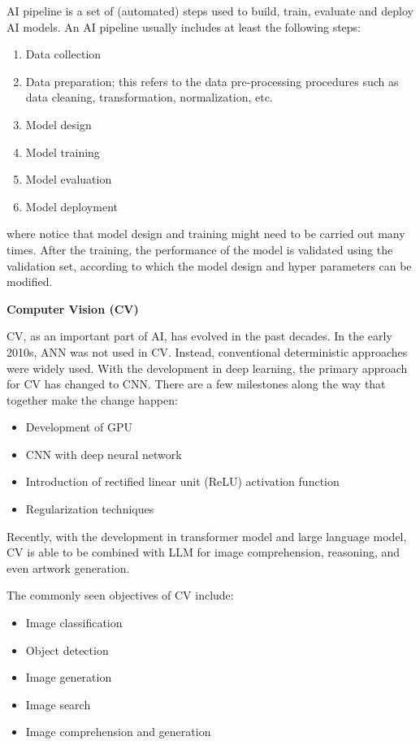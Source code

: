 AI pipeline is a set of (automated) steps used to build, train, evaluate and deploy AI models. An AI pipeline usually includes at least the following steps:
\begin{enumerate}
  \item Data collection
  \item Data preparation; this refers to the data pre-processing procedures such as data cleaning, transformation, normalization, etc.
  \item Model design
  \item Model training
  \item Model evaluation
  \item Model deployment
\end{enumerate}
where notice that model design and training might need to be carried out many times. After the training, the performance of the model is validated using the validation set, according to which the model design and hyper parameters can be modified.

\vspace{0.1in}
\noindent \textbf{Computer Vision (CV)}
\vspace{0.1in}

CV, as an important part of AI, has evolved in the past decades. In the early 2010s, ANN was not used in CV. Instead, conventional deterministic approaches were widely used. With the development in deep learning, the primary approach for CV has changed to CNN. There are a few milestones along the way that together make the change happen:
\begin{itemize}
  \item Development of GPU
  \item CNN with deep neural network
  \item Introduction of rectified linear unit (ReLU) activation function
  \item Regularization techniques
\end{itemize}
Recently, with the development in transformer model and large language model, CV is able to be combined with LLM for image comprehension, reasoning, and even artwork generation.

The commonly seen objectives of CV include:
\begin{itemize}
  \item Image classification
  \item Object detection
  \item Image generation
  \item Image search
  \item Image comprehension and generation
\end{itemize}


